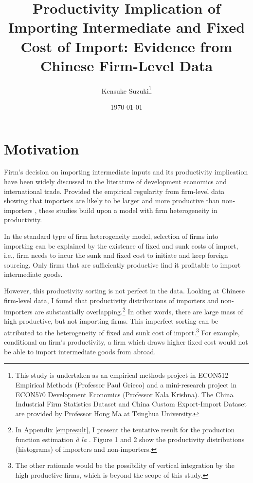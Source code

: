 \documentclass[11pt,letter]{article}
\title{Productivity Implication of Importing Intermediate and Fixed Cost of Import: Evidence from Chinese Firm-Level Data}
\author{Kensuke Suzuki\thanks{ %
			This study is undertaken as an empirical methods project in ECON512 Empirical Methods (Professor Paul Grieco) and a mini-research project in ECON570 Development Economics (Professor Kala Krishna). The China Industrial Firm Statistics Dataset and China Custom Export-Import Dataset are provided by Professor Hong Ma at Tsinghua University.}
						}
\date{\today}
\begin{document}
 




\maketitle


\section{Motivation}

Firm's decision on importing intermediate inputs and its productivity implication have been widely discussed in the literature of development economics and international trade. Provided the empirical regularity from firm-level data showing that importers are likely to be larger and more productive than non-importers \citep{Bernard2012}, these studies build upon a model with firm heterogeneity in productivity.  

In the standard \citeauthor{Melitz2003} type of firm heterogeneity model, selection of firms into importing can be explained by the existence of fixed and sunk costs of import, i.e., firm needs to incur the sunk and fixed cost to initiate and keep foreign sourcing. Only firms that are sufficiently productive find it profitable to import intermediate goods. 

However, this productivity sorting is not perfect in the data. Looking at Chinese firm-level data, I found that productivity distributions of importers and non-importers are substantially overlapping.\footnote{In Appendix \ref{empresult}, I present the tentative result for the production function estimation \textit{\`a la} \citet{Levinsohn2003}. Figure 1 and 2 show the productivity distributions (histograms) of importers and non-importers.} In other words, there are large mass of high productive, but not importing firms. This imperfect sorting can be attributed to the heterogeneity of fixed and sunk cost of import.\footnote{The other rationale would be the possibility of vertical integration by the high productive firms, which is beyond the scope of this study.} For example, conditional on firm's productivity, a firm which draws higher fixed cost would not be able to import intermediate goods from abroad.
\end{document}
